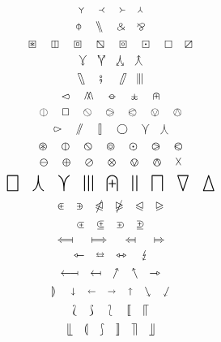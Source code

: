\documentclass{article}
\begin{document}
\[
\Ydown \quad \Yleft \quad \Yright \quad \Yup
\]
\[
\baro \quad \bbslash \quad \binampersand \quad \bindnasrepma
\]
\[
\boxast \quad \boxbar \quad \boxbox \quad \boxbslash \quad \boxcircle \quad \boxdot \quad \boxempty \quad \boxslash
\]
\[
\curlyveedownarrow \quad \curlyveeuparrow \quad \curlywedgedownarrow \quad \curlywedgeuparrow
\]
\[
\fatbslash \quad \fatsemi \quad \fatslash \quad \interleave
\]
\[
\leftslice \quad \merge \quad \minuso \quad \moo \quad \nplus
\]
\[
\obar \quad \oblong \quad \obslash \quad \ogreaterthan \quad \olessthan \quad \ovee \quad \owedge
\]
\[
\rightslice \quad \sslash \quad \talloblong \quad \varbigcirc \quad \varcurlyvee \quad \varcurlywedge
\]
\[
\varoast \quad \varobar \quad \varobslash \quad \varocircle \quad \varodot \quad \varogreaterthan \quad \varolessthan
\]
\[
\varominus \quad \varoplus \quad \varoslash \quad \varotimes \quad \varovee \quad \varowedge \quad \vartimes
\]
\[
\bigbox \quad \bigcurlywedge \quad \bigcurlyvee \quad \biginterleave \quad \bignplus \quad \bigparallel \quad \bigsqcap \quad \bigtriangledown \quad \bigtriangleup
\]
\[
\inplus \quad \niplus \quad \ntrianglelefteqslant \quad \ntrianglerighteqslant \quad \trianglelefteqslant \quad \trianglerighteqslant
\]
\[
\subsetplus \quad \subsetpluseq \quad \supsetplus \quad \supsetpluseq
\]
\[
\Longmapsfrom \quad \Longmapsto \quad \Mapsfrom \quad \Mapsto
\]
\[
\leftarrowtriangle \quad \leftrightarroweq \quad \leftrightarrowtriangle \quad \lightning
\]
\[
\longmapsfrom \quad \mapsfrom \quad \nnearrow \quad \nnwarrow \quad \rightarrowtriangle
\]
\[
\rrparenthesis \quad \shortdownarrow \quad \shortleftarrow \quad \shortrightarrow \quad \shortuparrow \quad \ssearrow \quad \sswarrow
\]
\[
\Lbag \quad \Rbag \quad \lbag \quad \llbracket \quad \llceil
\]
\[
\llfloor \quad \llparenthesis \quad \rbag \quad \rrbracket \quad \rrceil \quad \rrfloor
\]
\end{document}

